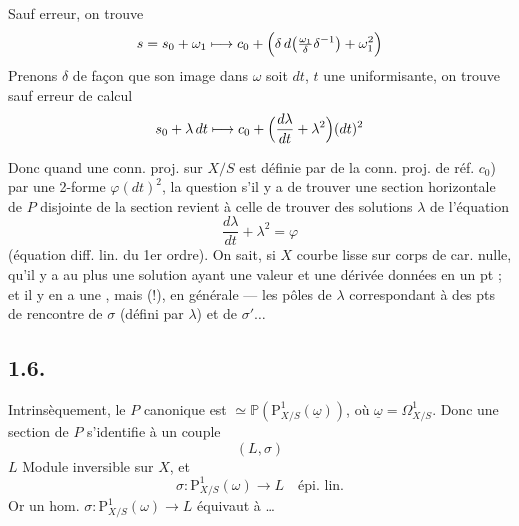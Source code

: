 \documentclass[11pt,a4paper]{article}
\begin{document}
Sauf erreur, on trouve
\[
s = s_0 + \omega_1 \longmapsto c_0 + \Bigl(\delta\,d\bigl(\tfrac{\omega_1}{\delta}\delta^{-1}\bigr) + \omega_1^2\Bigr)
\]
Prenons $\delta$ de façon que son image dans $\omega$ soit $dt$, $t$ une uniformisante, on trouve sauf erreur de calcul
\[
s_0 + \lambda\,dt \longmapsto c_0 + \Bigl(\frac{d\lambda}{dt} + \lambda^2\Bigr)(dt)^2
\]

Donc quand une conn. proj. sur $X/S$ est définie par  de la \struck{\ill{}} conn. proj. de réf. $c_0$) par une 2-forme $\varphi(dt)^2$, la question s'il y a  de trouver une section horizontale de $P$ disjointe de la section  \add{$\sigma$} revient à celle de trouver des solutions $\lambda$ de l'équation
\[
\frac{d\lambda}{dt} + \lambda^2 = \varphi
\]
(équation diff.  lin. du 1er ordre). On sait, si $X$ courbe lisse sur corps \uncertain{\ill{}} de car. nulle, qu'il y a au plus une solution ayant une valeur et une dérivée données en un pt ; et il y en a une , mais  (!), en \uncertain{\ill{}} générale --- les pôles de  $\lambda$ correspondant \struck{\ill{}}  à des pts de rencontre de $\sigma$ (défini par $\lambda$) et de $\sigma'\ldots$

\subsection{1.6.}

Intrinsèquement, le $P$ canonique est $\simeq \mathbb{P}(\mathrm{P}^1_{X/S}(\underline{\omega}))$, où $\underline{\omega} = \Omega^1_{X/S}$. Donc une section de $P$ \struck{\ill{}} s'identifie à un couple
\[
(L, \sigma)
\]
$L$ Module inversible sur $X$, et
\[
\sigma : \mathrm{P}^1_{X/S}(\omega) \to L \quad \text{épi. lin.}
\]
Or un hom.  $\sigma : \mathrm{P}^1_{X/S}(\omega) \to L$ équivaut à \ldots
{}
\end{document}
